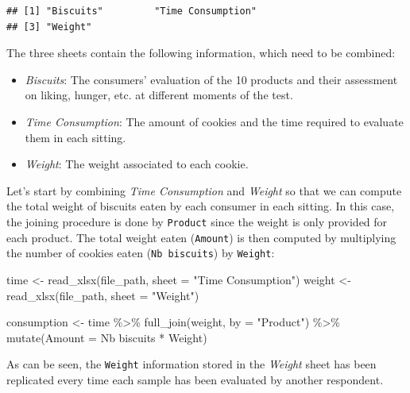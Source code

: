 \documentclass[
]{krantz}
\makeatletter
\newenvironment{Shaded}{\begin{snugshade}}{\end{snugshade}}
\newcommand{\AttributeTok}[1]{\textcolor[rgb]{0.61,0.61,0.61}{#1}}
\newcommand{\FunctionTok}[1]{\textcolor[rgb]{0,0,0}{#1}}
\newcommand{\NormalTok}[1]{#1}
\newcommand{\OtherTok}[1]{\textcolor[rgb]{0.37,0.37,0.37}{#1}}
\newcommand{\SpecialCharTok}[1]{\textcolor[rgb]{0,0,0}{#1}}
\newcommand{\StringTok}[1]{\textcolor[rgb]{0.5,0.5,0.5}{#1}}
\providecommand{\tightlist}{%
  \setlength{\itemsep}{0pt}\setlength{\parskip}{0pt}}
\newenvironment{kframe}{%
\medskip{}
\setlength{\fboxsep}{.8em}
 \def\at@end@of@kframe{}%
 \ifinner\ifhmode%
  \def\at@end@of@kframe{\end{minipage}}%
  \begin{minipage}{\columnwidth}%
 \fi\fi%
 \def\FrameCommand##1{\hskip\@totalleftmargin \hskip-\fboxsep
 \colorbox{shadecolor}{##1}\hskip-\fboxsep
     \hskip-\linewidth \hskip-\@totalleftmargin \hskip\columnwidth}%
 \MakeFramed {\advance\hsize-\width
   \@totalleftmargin\z@ \linewidth\hsize
   \@setminipage}}%
 {\par\unskip\endMakeFramed%
 \at@end@of@kframe}
\renewenvironment{Shaded}{\begin{kframe}}{\end{kframe}}
\makeatother
\begin{document}
\begin{verbatim}
## [1] "Biscuits"         "Time Consumption"
## [3] "Weight"
\end{verbatim}

The three sheets contain the following information, which need to be combined:

\begin{itemize}
\tightlist
\item
  \emph{Biscuits}: The consumers' evaluation of the 10 products and their assessment on liking, hunger, etc. at different moments of the test.
\item
  \emph{Time Consumption}: The amount of cookies and the time required to evaluate them in each sitting.
\item
  \emph{Weight}: The weight associated to each cookie.
\end{itemize}

Let's start by combining \emph{Time Consumption} and \emph{Weight} so that we can compute the total weight of biscuits eaten by each consumer in each sitting. In this case, the joining procedure is done by \texttt{Product} since the weight is only provided for each product. The total weight eaten (\texttt{Amount}) is then computed by multiplying the number of cookies eaten (\texttt{Nb\ biscuits}) by \texttt{Weight}:

\begin{Shaded}
\begin{Highlighting}[]
\NormalTok{time }\OtherTok{\textless{}{-}} \FunctionTok{read\_xlsx}\NormalTok{(file\_path, }\AttributeTok{sheet =} \StringTok{"Time Consumption"}\NormalTok{)}
\NormalTok{weight }\OtherTok{\textless{}{-}} \FunctionTok{read\_xlsx}\NormalTok{(file\_path, }\AttributeTok{sheet =} \StringTok{"Weight"}\NormalTok{)}

\NormalTok{consumption }\OtherTok{\textless{}{-}}\NormalTok{ time }\SpecialCharTok{\%\textgreater{}\%}
    \FunctionTok{full\_join}\NormalTok{(weight, }\AttributeTok{by =} \StringTok{"Product"}\NormalTok{) }\SpecialCharTok{\%\textgreater{}\%}
    \FunctionTok{mutate}\NormalTok{(}\AttributeTok{Amount =} \StringTok{\textasciigrave{}}\AttributeTok{Nb biscuits}\StringTok{\textasciigrave{}} \SpecialCharTok{*}\NormalTok{ Weight)}
\end{Highlighting}
\end{Shaded}

As can be seen, the \texttt{Weight} information stored in the \emph{Weight} sheet has been replicated every time each sample has been evaluated by another respondent.
\end{document}
